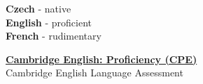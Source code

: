 \documentclass[9pt]{developercv} %
\begin{document}
\begin{minipage}[t]{0.5\textwidth}
	\vspace{-\baselineskip} %

	
	\textbf{Czech} - native\\
	\textbf{English} - proficient\\
	\textbf{French} - rudimentary\\
\end{minipage}
\hfill
\begin{minipage}[t]{0.5\textwidth}
	\vspace{-\baselineskip} %
	

	{\textbf{\href{http://www.cambridgeenglish.org/exams/proficiency/?utm_campaign=linkedinprof}{Cambridge English: Proficiency (CPE)}}\\\footnotesize{Cambridge English Language Assessment}}
\end{minipage}
\hfill
\\
% 	
% 	
{}
\end{document}
